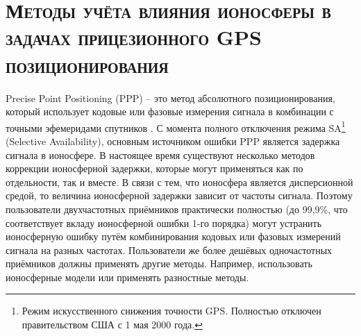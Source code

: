\chapter{\textsc{Методы учёта влияния ионосферы в задачах прицезионного GPS позиционирования}}

Precise Point Positioning (PPP) -- это метод абсолютного позиционирования, который использует кодовые или фазовые измерения сигнала в комбинации с точными эфемеридами спутников \cite{Zumberge1997}. 
С момента полного отключения режима SA\footnote{Режим искусственного снижения точности GPS. Полностью отключен правительством США с 1 мая 2000 года.} (Selective Availability), основным источником ошибки PPP является задержка сигнала в ионосфере. 
В настоящее время существуют несколько методов коррекции ионосферной задержки, которые могут применяться как по отдельности, так и вместе.
В связи с тем, что ионосфера является дисперсионной средой, то величина ионосферной задержки зависит от частоты сигнала.
Поэтому пользователи двухчастотных приёмников практически полностью (до 99,9\%, что соответствует вкладу ионосферной ошибки 1-го порядка) могут устранить ионосферную ошибку путём комбинирования кодовых или фазовых измерений сигнала на разных частотах.
Пользователи же более дешёвых одночастотных приёмников должны применять другие методы.
Например, использовать ионосферные модели или применять разностные методы. 